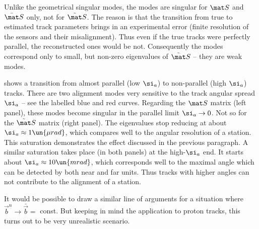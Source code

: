 Unlike the geometrical singular modes, the modes  are singular for $\mat S$ and $\bar\mat S$ only, not for $\tilde\mat S$. The reason is that the transition  from true to estimated track parameters brings in an experimental error (finite resolution of the sensors and their misalignment). Thus even if the true tracks were perfectly parallel, the reconstructed ones would be not. Consequently the modes  correspond only to small, but non-zero eigenvalues of $\tilde\mat S$ -- they are weak modes.

 shows a transition from almost parallel (low $\si_a$) to non-parallel (high $\si_a$) tracks. There are two alignment modes very sensitive to the track angular spread $\si_a$ -- see the labelled blue and red curves. Regarding the $\mat S$ matrix (left panel), these modes become singular in the parallel limit $\si_a \to 0$. Not so for the $\tilde\mat S$ matrix (right panel). The eigenvalues stop reducing at about $\si_a\approx 1\un{\mu rad}$, which compares well to the angular resolution of a station. This saturation demonstrates the effect discussed in the previous paragraph. A similar saturation takes place (in both panels) at the high-$\si_a$ end. It starts about $\si_a \approx 10\un{mrad}$, which corresponds well to the maximal angle which can be detected by both near and far units. Thus tracks with higher angles can not contribute to the alignment of a station.



It would be possible to draw a similar line of arguments for a situation where $\vec b^n\to \bar\vec b = $ const. But keeping in mind the application to  proton tracks, this turns out to be very unrealistic scenario.

